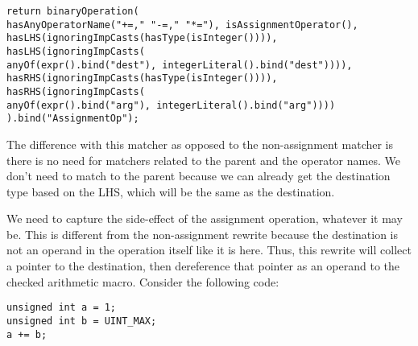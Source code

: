 \begin{center}
\parbox{0.9\linewidth}{
\texttt{return binaryOperation(\\
\hspace*{2em}hasAnyOperatorName("+=," "-=," "*="), isAssignmentOperator(),\\
\hspace*{2em}hasLHS(ignoringImpCasts(hasType(isInteger()))),\\
\hspace*{2em}hasLHS(ignoringImpCasts(\\
\hspace*{4em}anyOf(expr().bind("dest"), integerLiteral().bind("dest")))),\\
\hspace*{2em}hasRHS(ignoringImpCasts(hasType(isInteger()))),\\
\hspace*{2em}hasRHS(ignoringImpCasts(\\
\hspace*{4em}anyOf(expr().bind("arg"), integerLiteral().bind("arg"))))\\
).bind("AssignmentOp");}
}
\end{center}

The difference with this matcher as opposed to the non-assignment matcher is there is no need for matchers related to the parent and the operator names. We don't need to match to the parent because we can already get the destination type based on the LHS, which will be the same as the destination.

We need to capture the side-effect of the assignment operation, whatever it may be. This is different from the non-assignment rewrite because the destination is not an operand in the operation itself like it is here. Thus, this rewrite will collect a pointer to the destination, then dereference that pointer as an operand to the checked arithmetic macro. Consider the following code:

\begin{center}
\parbox{0.6\linewidth}{
\texttt{unsigned int a = 1;\\
unsigned int b = UINT\_MAX;\\
a += b;}
}
\end{center}

